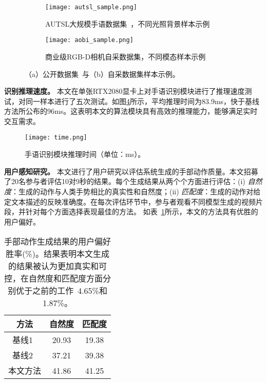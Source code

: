 \begin{figure}
    \centering
    \begin{subfigure}[b]{\linewidth}
      \centering
      \texttt{[image: autsl\_sample.png]}
      \caption{AUTSL大规模手语数据集~\cite{sincan2020autsl}，不同光照背景样本示例\label{fig:autsl_sample}}
    \end{subfigure}
    \begin{subfigure}[b]{\linewidth}
      \centering
      \texttt{[image: aobi\_sample.png]}
      \caption{商业级RGB-D相机自采数据集，不同模态样本示例\label{fig:aobi_sample}}
    \end{subfigure}
    \caption{（a）公开数据集~\cite{sincan2020autsl}与（b）自采数据集样本示例。}
    \label{fig:dataset_sample}
  \end{figure}



\textbf{识别推理速度。}
本文在单张RTX2080显卡上对手语识别模块进行了推理速度测试，对同一样本进行了五次测试。如图\ref{fig:time}所示，平均推理时间为83.9ms，快于基线方法\cite{范桂双2020基于S3D}所公布的96ms。这表明本文的算法模块具有高效的推理能力，能够满足实时交互需求。

\begin{figure}
  \centering
  \texttt{[image: time.png]}
  \caption{手语识别模块推理时间（单位：ms）。}
  \label{fig:time}
\end{figure}


\textbf{用户感知研究。}
本文进行了用户研究以评估系统生成的手部动作质量。本文招募了20名参与者评估10对9秒的结果。每个生成结果从两个个方面进行评估：(i) \textit{自然度}：生成的动作与人类手势相比的真实性和自然度；(ii) \textit{匹配度}：生成的动作对给定文本描述的反映准确度。在每次评估环节中，参与者观看不同模型生成的视频片段，并针对每个方面选择表现最佳的方法。
如表~\ref{tab:perceptual_study}所示，本文的方法具有优胜的用户偏好。

\begin{table}[t]
    \centering
    \caption{手部动作生成结果的用户偏好胜率(\%)。结果表明本文生成的结果被认为更加真实和可控，在自然度和匹配度方面分别优于之前的工作~\cite{chen2024syntalker}4.65\%和1.87\%。}
    \small
    \label{tab:perceptual_study}
    \begin{tabular}{c cc}
    \toprule
    方法 & 自然度 & 匹配度 \\
    \midrule
    基线1~\cite{yang2024freetalker} & 20.93  & 19.38 \\
    基线2~\cite{chen2024syntalker} & 37.21  & 39.38 \\
    本文方法 & 41.86  & 41.25 \\
    \bottomrule
    \end{tabular}
\end{table}


